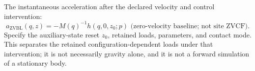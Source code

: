 \begin{description}[style=nextline,leftmargin=0pt,font=\bfseries,itemsep=0.5em]
\item[Zero-Velocity Counterfactual (ZVCF)]
The instantaneous acceleration after the declared velocity and control intervention:
\begin{equation*}
a_{\mathrm{ZVBL}}(q,z)=-M(q)^{-1}h(q,0,z_0;p) \text{ (zero-velocity baseline; not site ZVCF)}.
\end{equation*}
Specify the auxiliary-state reset $z_0$, retained loads, parameters, and contact mode. This separates the retained configuration-dependent loads under that intervention; it is not necessarily gravity alone, and it is not a forward simulation of a stationary body.
\end{description}

